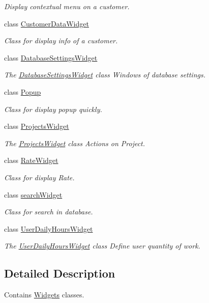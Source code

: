 \begin{DoxyCompactItemize}
\begin{DoxyCompactList}\small\item\em Display contextual menu on a customer. \end{DoxyCompactList}\item 
class \hyperlink{classGui_1_1Widgets_1_1CustomerDataWidget}{Customer\-Data\-Widget}
\begin{DoxyCompactList}\small\item\em Class for display info of a customer. \end{DoxyCompactList}\item 
class \hyperlink{classGui_1_1Widgets_1_1DatabaseSettingsWidget}{Database\-Settings\-Widget}
\begin{DoxyCompactList}\small\item\em The \hyperlink{classGui_1_1Widgets_1_1DatabaseSettingsWidget}{Database\-Settings\-Widget} class Windows of database settings. \end{DoxyCompactList}\item 
class \hyperlink{classGui_1_1Widgets_1_1Popup}{Popup}
\begin{DoxyCompactList}\small\item\em Class for display popup quickly. \end{DoxyCompactList}\item 
class \hyperlink{classGui_1_1Widgets_1_1ProjectsWidget}{Projects\-Widget}
\begin{DoxyCompactList}\small\item\em The \hyperlink{classGui_1_1Widgets_1_1ProjectsWidget}{Projects\-Widget} class Actions on Project. \end{DoxyCompactList}\item 
class \hyperlink{classGui_1_1Widgets_1_1RateWidget}{Rate\-Widget}
\begin{DoxyCompactList}\small\item\em Class for display Rate. \end{DoxyCompactList}\item 
class \hyperlink{classGui_1_1Widgets_1_1searchWidget}{search\-Widget}
\begin{DoxyCompactList}\small\item\em Class for search in database. \end{DoxyCompactList}\item 
class \hyperlink{classGui_1_1Widgets_1_1UserDailyHoursWidget}{User\-Daily\-Hours\-Widget}
\begin{DoxyCompactList}\small\item\em The \hyperlink{classGui_1_1Widgets_1_1UserDailyHoursWidget}{User\-Daily\-Hours\-Widget} class Define user quantity of work. \end{DoxyCompactList}\end{DoxyCompactItemize}


\subsection{Detailed Description}
Contains \hyperlink{namespaceGui_1_1Widgets}{Widgets} classes. 